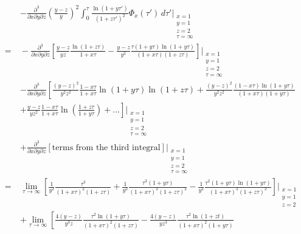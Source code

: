 \documentclass[11pt]{article}
\begin{document}
\begin{align}
    \quad& -\frac{\partial^3}{\partial x \partial y \partial z} \left(\frac{y-z}{y}\right)^2 \int_0^{\tau} \frac{\ln(1+y\tau')}{(1+z\tau')^2} \Phi_x(\tau') \,d\tau'\Bigg\vert_{\substack{x=1 \\ y=1 \\ z=2 \\ \tau=\infty}} \\\nonumber
    =&{} -\frac{\partial^3}{\partial x \partial y \partial  z} \left[\frac{y-z}{yz}\frac{\ln(1+z\tau)}{1+x\tau} - \frac{y-z}{y^2}\frac{\tau(1+y\tau)\ln(1+y\tau)}{(1+x\tau)(1+z\tau)}\right]\Bigg\vert_{\substack{x=1 \\ y=1 \\ z=2 \\ \tau=\infty}} \\\nonumber
    &- \frac{\partial^3}{\partial x \partial y \partial  z} \left[\frac{(y-z)^2}{y^2z^2}\frac{1-x\tau}{1+x\tau}\ln(1+y\tau)\ln(1+z\tau)
    + \frac{(y-z)^2}{y^2z^2}\frac{(1-x\tau)\ln(1+y\tau)}{(1+x\tau)(1+y\tau)} \right. \\\nonumber
    &+ \left. \frac{y-z}{yz^2}\frac{1-x\tau}{1+x\tau} \ln\left(\frac{1+z\tau}{1+y\tau}\right)  + ...\right]\Bigg\vert_{\substack{x=1 \\ y=1 \\ z=2 \\ \tau=\infty}} \\\nonumber
    &+ \frac{\partial^3}{\partial x \partial y \partial  z} \left[\textrm{terms from the third integral}\right]\Bigg\vert_{\substack{x=1 \\ y=1 \\ z=2 \\ \tau=\infty}} \\\nonumber
    =&{} \lim_{\tau\to\infty} \left[\frac{1}{y^2}\frac{\tau^3}{(1+x\tau)^2(1+z\tau)} + \frac{1}{y^2}\frac{\tau^3(1+y\tau)}{(1+x\tau)^2(1+z\tau)^2}
    - \frac{1}{y^2}\frac{\tau^2(1+y\tau)\ln(1+y\tau)}{(1+x\tau)^2(1+z\tau)^2}\right]\Bigg\vert_{\substack{x=1 \\ y=1 \\ z=2}} \\\nonumber
    &+ \lim_{\tau\to\infty} \left[
    \frac{4(y-z)}{y^3z}\frac{\tau^2\ln(1+y\tau)}{(1+x\tau)^2(1+z\tau)}
    -\frac{4(y-z)}{yz^3}\frac{\tau^2\ln(1+zt)}{(1+x\tau)^2(1+y\tau)}

\end{align}
\end{document}
